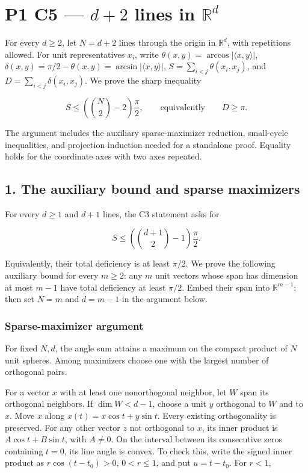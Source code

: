 \documentclass[11pt,a4paper]{article}
\begin{document}
\section{\texorpdfstring{P1 C5 --- \(d+2\) lines in \(\mathbb R^d\)}{P1 C5 --- d+2 lines in \textbackslash mathbb R\^{}d}}\label{p1-c5-d2-lines-in-mathbb-rd}

For every \(d\ge2\), let \(N=d+2\) lines through the origin in \(\mathbb R^d\), with repetitions allowed. For unit representatives \(x_i\), write \(\theta(x,y)=\arccos|\langle x,y\rangle|\), \(\delta(x,y)=\pi/2-\theta(x,y)=\arcsin|\langle x,y\rangle|\), \(S=\sum_{i<j}\theta(x_i,x_j)\), and \(D=\sum_{i<j}\delta(x_i,x_j)\). We prove the sharp inequality

\[
S\le\left(\binom{N}{2}-2\right)\frac{\pi}{2},
\qquad\text{equivalently}\qquad D\ge\pi.
\]

The argument includes the auxiliary sparse-maximizer reduction, small-cycle inequalities, and projection induction needed for a standalone proof. Equality holds for the coordinate axes with two axes repeated.

\subsection{1. The auxiliary bound and sparse maximizers}\label{the-auxiliary-bound-and-sparse-maximizers}

For every \(d\ge1\) and \(d+1\) lines, the C3 statement asks for

\[
S\le\left(\binom{d+1}{2}-1\right)\frac{\pi}{2}.
\]

Equivalently, their total deficiency is at least \(\pi/2\). We prove the following auxiliary bound for every \(m\ge2\): any \(m\) unit vectors whose span has dimension at most \(m-1\) have total deficiency at least \(\pi/2\). Embed their span into \(\mathbb R^{m-1}\); then set \(N=m\) and \(d=m-1\) in the argument below.

\subsubsection{Sparse-maximizer argument}\label{sparse-maximizer-argument}

For fixed \(N,d\), the angle sum attains a maximum on the compact product of \(N\) unit spheres. Among maximizers choose one with the largest number of orthogonal pairs.

For a vector \(x\) with at least one nonorthogonal neighbor, let \(W\) span its orthogonal neighbors. If \(\dim W<d-1\), choose a unit \(y\) orthogonal to \(W\) and to \(x\). Move \(x\) along \(x(t)=x\cos t+y\sin t\). Every existing orthogonality is preserved. For any other vector \(z\) not orthogonal to \(x\), its inner product is \(A\cos t+B\sin t\), with \(A\ne0\). On the interval between its consecutive zeros containing \(t=0\), its line angle is convex. To check this, write the signed inner product as \(r\cos(t-t_0)>0\), \(0<r\le1\), and put \(u=t-t_0\). For \(r<1\),
\end{document}
